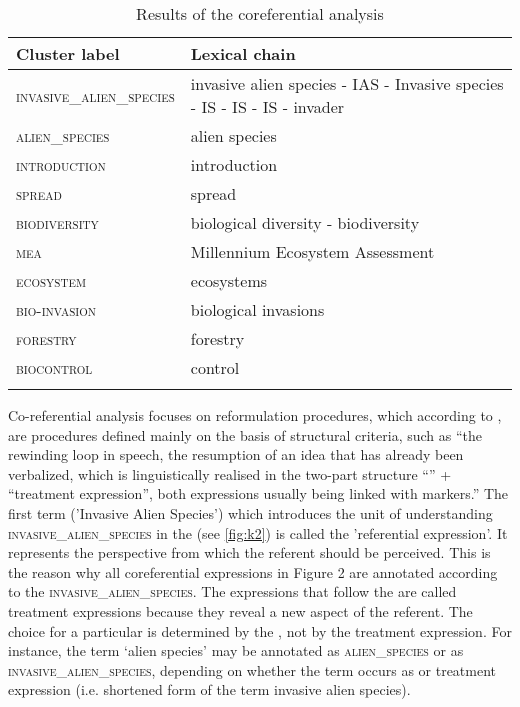 \documentclass[output=paper]{langsci/langscibook.cls}
\begin{document}
\begin{table} 
 
\begin{tabularx}{\textwidth}{lX}
\lsptoprule
\textbf{Cluster label} & \textbf{Lexical chain}\\
\midrule
\textsc{invasive\_alien\_species} & invasive alien species - IAS - Invasive species 
- IS - IS - IS - invader \\
\textsc{alien\_species} & alien species\\
\textsc{introduction} & introduction\\
\textsc{spread} & spread\\
\textsc{biodiversity} & biological diversity - biodiversity \\
\textsc{mea} & Millennium Ecosystem Assessment \\
\textsc{ecosystem} & ecosystems\\
\textsc{bio-invasion} & biological invasions \\
\textsc{forestry} & forestry \\
\textsc{biocontrol} & control\\
\lspbottomrule
\end{tabularx} 
\caption{Results of the coreferential analysis}
\label{tab:3}
\end{table}

Co-referential analysis focuses on reformulation procedures, which according to 
\citet[212]{Ciapuscio2003}, are procedures defined mainly on the basis of structural 
criteria, such as ``the rewinding loop in speech, the resumption of an idea that 
has already been verbalized, which is linguistically realised in the two-part structure 
``'' + ``treatment expression'', both expressions usually 
being linked with markers.'' The first term ('Invasive Alien Species') which introduces the unit of understanding 
\textsc{invasive\_alien\_species} in the  (see \ref{fig:k2}) is called the 'referential 
expression'. It represents the perspective from which the referent should be perceived. 
This is the reason why all coreferential expressions in Figure 2 are annotated according 
to the  \textsc{invasive\_alien\_species}. The expressions that follow 
the  are called treatment expressions because they reveal 
a new aspect of the referent. The choice for a particular  is determined 
by the , not by the treatment expression. For instance, the 
term `alien species' may be annotated as \textsc{alien\_species} or as \textsc{invasive\_alien\_species}, 
depending on whether the term occurs as  or treatment expression 
(i.e. shortened form of the term invasive alien species).
\end{document}
